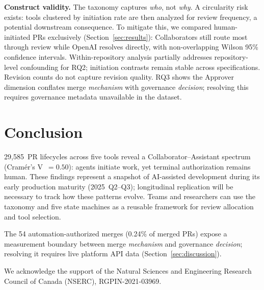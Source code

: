\documentclass[sigconf]{acmart}
\begin{document}
\textbf{Construct validity.}
The taxonomy captures \emph{who}, not \emph{why}.
A circularity risk exists: tools clustered by initiation rate are
then analyzed for review frequency, a potential downstream
consequence.
To mitigate this, we compared human-initiated PRs exclusively (Section~\ref{sec:results}): Collaborators still route most through review while OpenAI resolves directly, with non-overlapping Wilson 95\% confidence intervals.
Within-repository analysis partially addresses repository-level confounding for RQ2; initiation contrasts remain stable across specifications.
Revision counts do not capture revision quality.
RQ3 shows the Approver dimension conflates merge
\emph{mechanism} with governance \emph{decision}; resolving this
requires governance metadata unavailable in the dataset.

\enlargethispage{6\baselineskip}
\section{Conclusion}
\label{sec:conclusion}

29,585~PR lifecycles across five tools reveal a
Collaborator--Assistant spectrum (Cram\'er's V~$= 0.50$):
agents initiate work, yet terminal authorization remains human.
These findings represent a snapshot of AI-assisted development
during its early production maturity (2025~Q2--Q3);
longitudinal replication will be necessary to track how these
patterns evolve.
Teams and researchers can use the taxonomy and five state machines
as a reusable framework for review allocation and tool selection.

The 54 automation-authorized merges (0.24\% of merged PRs) expose a measurement boundary between merge \emph{mechanism} and governance \emph{decision}; resolving it requires live platform API data (Section~\ref{sec:discussion}).

\begin{acks}
We acknowledge the support of the Natural Sciences and Engineering Research Council of Canada (NSERC), RGPIN-2021-03969.
\end{acks}
\end{document}
